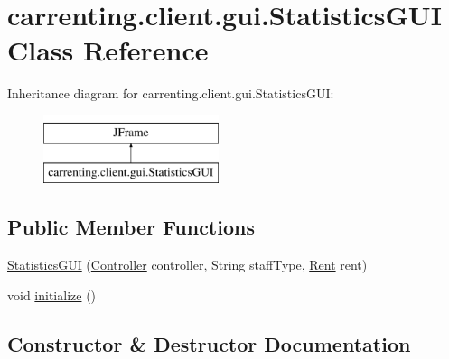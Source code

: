 \hypertarget{classcarrenting_1_1client_1_1gui_1_1_statistics_g_u_i}{}\section{carrenting.\+client.\+gui.\+Statistics\+G\+UI Class Reference}
\label{classcarrenting_1_1client_1_1gui_1_1_statistics_g_u_i}
Inheritance diagram for carrenting.\+client.\+gui.\+Statistics\+G\+UI\+:\begin{figure}[H]
\begin{center}
\leavevmode
\includegraphics[height=2.000000cm]{classcarrenting_1_1client_1_1gui_1_1_statistics_g_u_i}
\end{center}
\end{figure}
\subsection*{Public Member Functions}
\begin{DoxyCompactItemize}
\item 
\mbox{\hyperlink{classcarrenting_1_1client_1_1gui_1_1_statistics_g_u_i_a0915c0f120a7375519f8e8760b787190}{Statistics\+G\+UI}} (\mbox{\hyperlink{classcarrenting_1_1client_1_1_controller}{Controller}} controller, String staff\+Type, \mbox{\hyperlink{classcarrenting_1_1server_1_1jdo_1_1_rent}{Rent}} rent)
\item 
void \mbox{\hyperlink{classcarrenting_1_1client_1_1gui_1_1_statistics_g_u_i_a3b85a88b18774ebb23ef80a5dcebaceb}{initialize}} ()
\end{DoxyCompactItemize}


\subsection{Constructor \& Destructor Documentation}
\mbox{\label{classcarrenting_1_1client_1_1gui_1_1_statistics_g_u_i_a0915c0f120a7375519f8e8760b787190}} 
